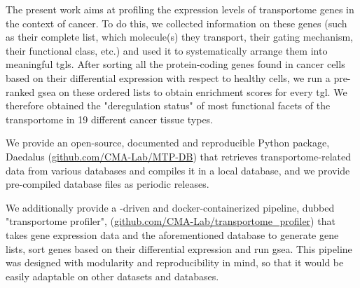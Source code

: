 The present work aims at profiling the expression levels of transportome genes in the context of cancer.
To do this, we collected information on these genes (such as their complete list, which molecule(s) they transport, their gating mechanism, their functional class, etc.) and used it to systematically arrange them into meaningful \glspl{tgl}.
After sorting all the protein-coding genes found in cancer cells based on their differential expression with respect to healthy cells, we run a pre-ranked \gls{gsea} on these ordered lists to obtain enrichment scores for every \gls{tgl}.
We therefore obtained the "deregulation status" of most functional facets of the transportome in 19 different cancer tissue types.

We provide an open-source, documented and reproducible Python package, Daedalus (\href{https://github.com/CMA-Lab/MTP-DB}{github.com/CMA-Lab/MTP-DB}) that retrieves transportome-related data from various databases and compiles it in a local  database, and we provide pre-compiled database files as periodic releases.

We additionally provide a -driven and docker-containerized pipeline, dubbed "transportome profiler", (\href{https://github.com/CMA-Lab/transportome_profiler}{github.com/CMA-Lab/transportome\_profiler}) that takes gene expression data and the aforementioned database to generate gene lists, sort genes based on their differential expression and run \gls{gsea}.
This pipeline was designed with modularity and reproducibility in mind, so that it would be easily adaptable on other datasets and databases.
